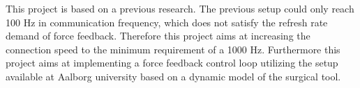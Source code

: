 This project is based on a previous research. The previous setup could only reach 100 Hz in communication frequency\cite{Chris_Surgical}, which does not satisfy the refresh rate demand of force feedback. Therefore this project aims at increasing the connection speed to the minimum
requirement of a 1000 Hz.
Furthermore this project aims at implementing a force feedback control loop utilizing the setup available at Aalborg university based on a dynamic model of the surgical tool.











